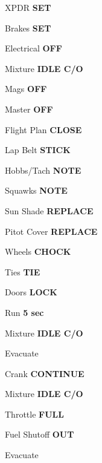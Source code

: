 \documentclass{article}
\begin{document}
\begin{multicols*}{3}
\color{black}

\colorbox{green!80!red}{}

XPDR \dotfill \textbf{SET}

Brakes \dotfill \textbf{SET}

Electrical \dotfill \textbf{OFF}

Mixture \dotfill \textbf{IDLE C/O}

Mags \dotfill \textbf{OFF}

Master \dotfill \textbf{OFF}

Flight Plan \dotfill \textbf{CLOSE}

\colorbox{green!80!red}{}

Lap Belt \dotfill \textbf{STICK}

Hobbs/Tach \dotfill \textbf{NOTE}

Squawks \dotfill \textbf{NOTE}

Sun Shade \dotfill \textbf{REPLACE}

Pitot Cover \dotfill \textbf{REPLACE}

Wheels \dotfill \textbf{CHOCK}

Ties \dotfill \textbf{TIE}

Doors \dotfill \textbf{LOCK} \\



\colorbox{red!80}{}

\colorbox{orange!80}{}

Run \dotfill \textbf{5 sec}

Mixture \dotfill \textbf{IDLE C/O}

Evacuate \dotfill

\colorbox{orange!80}{}

Crank \dotfill \textbf{CONTINUE}

Mixture \dotfill \textbf{IDLE C/O}

Throttle \dotfill \textbf{FULL}

Fuel Shutoff \dotfill \textbf{OUT}

Evacuate \dotfill \\

\end{multicols*}

\pagebreak
\end{document}
